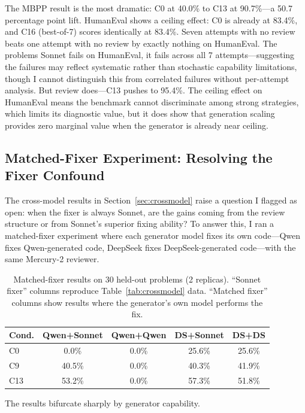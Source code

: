 \documentclass{article}
\begin{document}
The MBPP result is the most dramatic: C0 at 40.0\% to C13 at 90.7\%---a 50.7 percentage point lift. HumanEval shows a ceiling effect: C0 is already at 83.4\%, and C16 (best-of-7) scores identically at 83.4\%. Seven attempts with no review beats one attempt with no review by exactly nothing on HumanEval. The problems Sonnet fails on HumanEval, it fails across all 7 attempts---suggesting the failures may reflect systematic rather than stochastic capability limitations, though I cannot distinguish this from correlated failures without per-attempt analysis. But review does---C13 pushes to 95.4\%. The ceiling effect on HumanEval means the benchmark cannot discriminate among strong strategies, which limits its diagnostic value, but it does show that generation scaling provides zero marginal value when the generator is already near ceiling.

\subsection{Matched-Fixer Experiment: Resolving the Fixer Confound}
\label{sec:matchedfixer}

The cross-model results in Section~\ref{sec:crossmodel} raise a question I flagged as open: when the fixer is always Sonnet, are the gains coming from the review structure or from Sonnet's superior fixing ability? To answer this, I ran a matched-fixer experiment where each generator model fixes its own code---Qwen fixes Qwen-generated code, DeepSeek fixes DeepSeek-generated code---with the same Mercury-2 reviewer.

\begin{table}[t]
\centering
\caption{Matched-fixer results on 30 held-out problems (2 replicas). ``Sonnet fixer'' columns reproduce Table~\ref{tab:crossmodel} data. ``Matched fixer'' columns show results where the generator's own model performs the fix.}
\label{tab:matchedfixer}
\small
\begin{tabular}{lcccc}
\toprule
Cond. & Qwen+Sonnet & Qwen+Qwen & DS+Sonnet & DS+DS \\
\midrule
C0  & 0.0\%  & 0.0\%  & 25.6\% & 25.6\% \\
C9  & 40.5\% & 0.0\%  & 40.3\% & 41.9\% \\
C13 & 53.2\% & 0.0\%  & 57.3\% & 51.8\% \\
\bottomrule
\end{tabular}
\end{table}

The results bifurcate sharply by generator capability.
\end{document}

